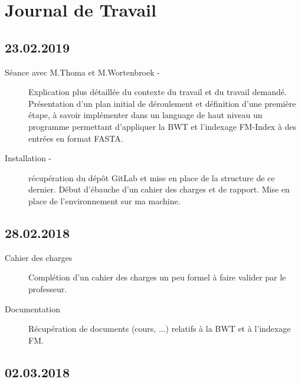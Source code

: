\chapter*{Journal de Travail}

\label{journal} %


\section*{23.02.2019}

\begin{description}
	\item [Séance avec M.Thoma et M.Wortenbroek -] Explication plus détaillée du contexte du travail et du travail demandé. Présentation d'un plan initial de déroulement et définition d'une première étape, à savoir implémenter dans un language de haut niveau un programme permettant d'appliquer la \textrm{BWT} et l'indexage \textrm{FM-Index} à des entrées en format \textrm{FASTA}.
	\item [Installation -] récupération du dépôt \textrm{GitLab} et mise en place de la structure de ce dernier. Début d'ébauche d'un cahier des charges et de rapport. Mise en place de l'environnement sur ma machine.
\end{description}

\section*{28.02.2018}

\begin{description}
	\item [Cahier des charges] Complétion d'un cahier des charges un peu formel à faire valider par le professeur.
	\item [Documentation] Récupération de documents (cours, ...) relatifs à la BWT et à l'indexage FM.
	
\end{description}

\section*{02.03.2018}

